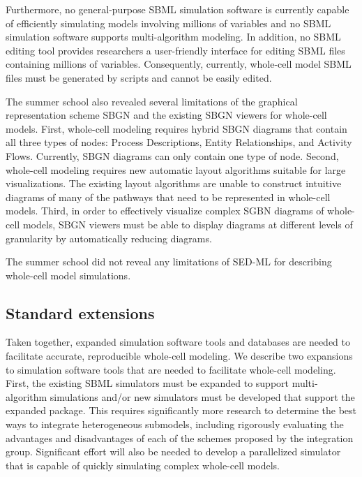 \documentclass[journal,transmag]{IEEEtran}
\begin{document}
Furthermore, no general-purpose SBML simulation software is currently capable of efficiently simulating models involving millions of variables and no SBML simulation software supports multi-algorithm modeling. In addition, no SBML editing tool provides researchers a user-friendly interface for editing SBML files containing millions of variables. Consequently, currently, whole-cell model SBML files must be generated by scripts and cannot be easily edited.

The summer school also revealed several limitations of the graphical representation scheme SBGN and the existing SBGN viewers for whole-cell models. First, whole-cell modeling requires hybrid SBGN diagrams that contain all three types of nodes: Process Descriptions, Entity Relationships, and Activity Flows. Currently, SBGN diagrams can only contain one type of node. Second, whole-cell modeling requires new automatic layout algorithms suitable for large visualizations. The existing layout algorithms are unable to construct intuitive diagrams of many of the pathways that need to be represented in whole-cell models. Third, in order to effectively visualize complex SGBN diagrams of whole-cell models, SBGN viewers must be able to display diagrams at different levels of granularity by automatically reducing diagrams.

The summer school did not reveal any limitations of SED-ML for describing whole-cell model simulations.

\subsection{Standard extensions}
Taken together, expanded simulation software tools and databases are needed to facilitate accurate, reproducible whole-cell modeling. We describe two expansions to simulation software tools that are needed to facilitate whole-cell modeling. First, the existing SBML simulators must be expanded to support multi-algorithm simulations and/or new simulators must be developed that support the expanded package. This requires significantly more research to determine the best ways to integrate heterogeneous submodels, including rigorously evaluating the advantages and disadvantages of each of the schemes proposed by the integration group. Significant effort will also be needed to develop a parallelized simulator that is capable of quickly simulating complex whole-cell models.
\end{document}
